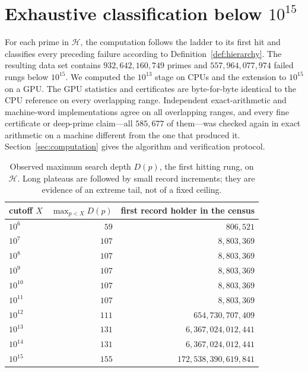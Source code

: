 \documentclass[11pt]{article}
\theoremstyle{definition}
\theoremstyle{remark}
\begin{document}
\section{Exhaustive classification below \texorpdfstring{$10^{15}$}{1e15}}\label{sec:data}

For each prime in $\mathcal{H}$, the computation follows the ladder to its first hit
and classifies every preceding failure according to Definition~\ref{def:hierarchy}.
The resulting data set contains
$932{,}642{,}160{,}749$ primes and $557{,}964{,}077{,}974$ failed rungs below $10^{15}$.
We computed the $10^{13}$ stage on CPUs and the extension to $10^{15}$ on a GPU. The
GPU statistics and certificates are byte-for-byte identical to the CPU reference on
every overlapping range. Independent exact-arithmetic and machine-word
implementations agree on all overlapping ranges, and every fine certificate or
deep-prime claim---all $585{,}677$ of them---was checked again in exact arithmetic on a
machine different from the one that produced it. Section~\ref{sec:computation} gives
the algorithm and verification protocol.

\begin{table}[ht]\centering
\caption{Observed maximum search depth $D(p)$, the first hitting rung, on
$\mathcal{H}$. Long plateaus are followed by small record increments; they are evidence
of an extreme tail, not of a fixed ceiling.}\label{tab:depth}
\begin{tabular}{lrr}
\toprule
cutoff $X$ & $\max_{p<X}D(p)$ & first record holder in the census \\
\midrule
$10^6$    & $59$  & $806{,}521$ \\
$10^7$    & $107$ & $8{,}803{,}369$ \\
$10^8$    & $107$ & $8{,}803{,}369$ \\
$10^9$    & $107$ & $8{,}803{,}369$ \\
$10^{10}$ & $107$ & $8{,}803{,}369$ \\
$10^{11}$ & $107$ & $8{,}803{,}369$ \\
$10^{12}$ & $111$ & $654{,}730{,}707{,}409$ \\
$10^{13}$ & $131$ & $6{,}367{,}024{,}012{,}441$ \\
$10^{14}$ & $131$ & $6{,}367{,}024{,}012{,}441$ \\
$10^{15}$ & $155$ & $172{,}538{,}390{,}619{,}841$ \\
\bottomrule
\end{tabular}
\end{table}
\end{document}
